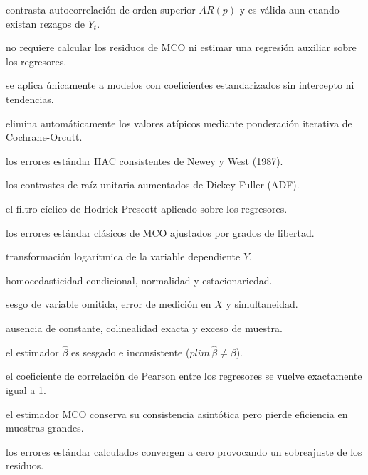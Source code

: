 \begin{opts}
    \item contrasta autocorrelación de orden superior $AR(p)$ y es válida aun cuando existan rezagos de $Y_t$.
    \item no requiere calcular los residuos de MCO ni estimar una regresión auxiliar sobre los regresores.
    \item se aplica únicamente a modelos con coeficientes estandarizados sin intercepto ni tendencias.
    \item elimina automáticamente los valores atípicos mediante ponderación iterativa de Cochrane-Orcutt.
\end{opts}

\begin{opts}
    \item los errores estándar HAC consistentes de Newey y West (1987).
    \item los contrastes de raíz unitaria aumentados de Dickey-Fuller (ADF).
    \item el filtro cíclico de Hodrick-Prescott aplicado sobre los regresores.
    \item los errores estándar clásicos de MCO ajustados por grados de libertad.
\end{opts}

\begin{opts}
    \item transformación logarítmica de la variable dependiente $Y$.
    \item homocedasticidad condicional, normalidad y estacionariedad.
    \item sesgo de variable omitida, error de medición en $X$ y simultaneidad.
    \item ausencia de constante, colinealidad exacta y exceso de muestra.
\end{opts}

\begin{opts}
    \item el estimador $\hat{\beta}$ es sesgado e inconsistente ($plim \, \hat{\beta} \neq \beta$).
    \item el coeficiente de correlación de Pearson entre los regresores se vuelve exactamente igual a 1.
    \item el estimador MCO conserva su consistencia asintótica pero pierde eficiencia en muestras grandes.
    \item los errores estándar calculados convergen a cero provocando un sobreajuste de los residuos.
\end{opts}

